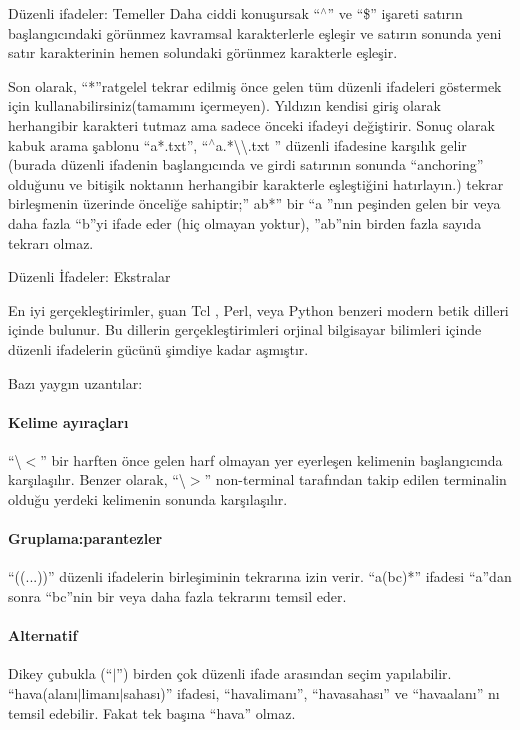 \documentclass[10pt,a5paper]{book}
\begin{document}
\begin{section}{Düzenli ifadeler: Temeller}
Daha ciddi konuşursak “$ ^\wedge $” ve “\$” işareti satırın başlangıcındaki görünmez kavramsal karakterlerle eşleşir ve satırın sonunda yeni satır karakterinin hemen solundaki görünmez karakterle eşleşir. 

Son olarak, “*”ratgelel tekrar edilmiş önce gelen tüm düzenli ifadeleri göstermek için kullanabilirsiniz(tamamını içermeyen). Yıldızın kendisi giriş olarak herhangibir karakteri tutmaz ama sadece önceki ifadeyi değiştirir. Sonuç olarak kabuk arama şablonu “a*.txt”, “$ ^\wedge $a.*\textbackslash \textbackslash.txt ” düzenli ifadesine karşılık gelir (burada düzenli ifadenin başlangıcında ve girdi satırının sonunda “anchoring” olduğunu ve bitişik noktanın herhangibir karakterle eşleştiğini hatırlayın.) tekrar birleşmenin üzerinde önceliğe sahiptir;” ab*” bir “a ”nın peşinden gelen bir veya daha fazla “b”yi ifade eder (hiç olmayan yoktur), ”ab”nin birden fazla sayıda tekrarı olmaz.

\begin{subsection}{Düzenli İfadeler: Ekstralar}

En iyi gerçekleştirimler, şuan Tcl , Perl, veya Python benzeri modern betik dilleri içinde bulunur. Bu dillerin gerçekleştirimleri orjinal bilgisayar bilimleri içinde düzenli ifadelerin gücünü şimdiye kadar aşmıştır. 

Bazı yaygın uzantılar:

\paragraph{Kelime ayıraçları}{ “\textbackslash $<$” bir harften önce gelen harf olmayan yer eyerleşen kelimenin başlangıcında karşılaşılır. Benzer olarak, “\textbackslash$>$”  non-terminal tarafından takip edilen terminalin olduğu yerdeki kelimenin sonunda karşılaşılır.}
\paragraph{Gruplama:parantezler}{ “((...))” düzenli ifadelerin birleşiminin tekrarına izin verir. “a(bc)*” ifadesi “a”dan sonra “bc”nin bir veya daha fazla tekrarını temsil eder.}
\paragraph{Alternatif} {Dikey çubukla (“$\vert$”) birden çok düzenli ifade arasından seçim yapılabilir. “hava(alanı$\vert$limanı$\vert$sahası)” ifadesi, “havalimanı”, “havasahası” ve “havaalanı” nı temsil edebilir. Fakat tek başına “hava” olmaz.}

\end{subsection}
\end{section}
\end{document}

